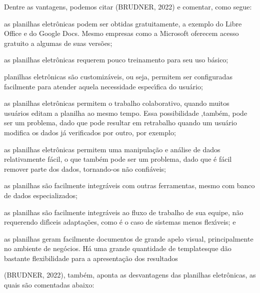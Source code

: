 \documentclass[
12pt,		%
openright,	%
twoside,  %
a4paper,			%
chapter=TITLE,		%
english,			%
french,				%
spanish,			%
brazil				%
]{USPSC-classe/USPSC}
\begin{document}
Dentre as vantagens, podemos citar (BRUDNER, 2022) e comentar, como segue:










\begin{alineas}
\item as planilhas eletr\^onicas podem ser obtidas gratuitamente, a exemplo do Libre Office e do Google Docs. Mesmo empresas como a Microsoft oferecem acesso gratuito a algumas de suas vers\~oes;
\item as planilhas eletr\^onicas requerem pouco treinamento para seu uso b\'asico;
\item planilhas eletr\^onicas s\~ao \textquotedbl customiz\'aveis\textquotedbl , ou seja, permitem ser configuradas facilmente para atender aquela necessidade espec\'{\i}fica do usu\'ario;
\item as planilhas eletr\^onicas permitem o trabalho colaborativo, quando muitos usu\'arios editam a planilha ao mesmo tempo. Essa possibilidade ,tamb\'em, pode ser um problema, dado que pode resultar em retrabalho quando um usu\'ario modifica os dados j\'a verificados por outro, por exemplo;
\item as planilhas eletr\^onicas permitem uma manipula\c{c}\~ao e an\'alise de dados relativamente f\'acil, o que tamb\'em pode ser um problema, dado que \'e f\'acil remover parte dos dados, tornando-os n\~ao confi\'aveis;
\item as planilhas s\~ao facilmente integr\'aveis com outras ferramentas, mesmo com banco de dados especializados;
\item as planilhas s\~ao facilmente integr\'aveis ao fluxo de trabalho de sua equipe, n\~ao requerendo dif\'{\i}ceis adapta\c{c}\~oes, como \'e o caso de sistemas menos flex\'{\i}veis; e
\item as planilhas geram facilmente documentos de grande apelo visual, principalmente no ambiente de neg\'ocios. H\'a uma grande quantidade de \textquotedbl templates\textquotedbl  que d\~ao bastante flexibilidade para a apresenta\c{c}\~ao dos resultados
\end{alineas}

(BRUDNER, 2022), tamb\'em, aponta as desvantagens das planilhas eletr\^onicas, as quais s\~ao comentadas abaixo:
\end{document}
